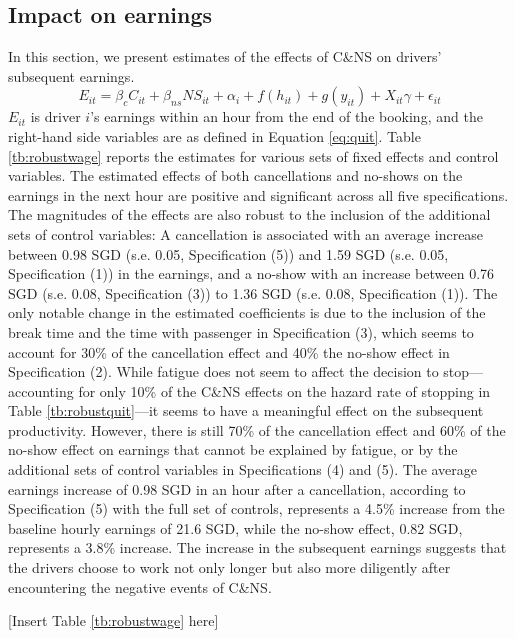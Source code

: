 \documentclass[reviewmode,AEJ]{AEA}
\begin{document}
\subsection{Impact on earnings}
In this section, we present estimates of the effects of C\&NS on drivers' subsequent earnings.
\begin{equation}
\label{eq:outcomes}
E_{it} = \beta_c C_{it} + \beta_{ns} {NS}_{it} + \alpha_i + f(h_{it}) + g(y_{it}) + X_{it}\gamma  + \epsilon_{it}
\end{equation}
$E_{it}$ is driver $i$'s earnings within an hour from the end of the booking, and the right-hand side variables are as defined in Equation \ref{eq:quit}. Table \ref{tb:robustwage} reports the estimates for various sets of fixed effects and control variables. The estimated effects of both cancellations and no-shows on the earnings in the next hour are positive and significant across all five specifications. The magnitudes of the effects are also robust to the inclusion of the additional sets of control variables: A cancellation is associated with an average increase between 0.98 SGD (s.e. 0.05, Specification (5)) and 1.59 SGD (s.e. 0.05, Specification (1)) in the earnings, and a no-show with an increase between 0.76 SGD (s.e. 0.08, Specification (3)) to 1.36 SGD (s.e. 0.08, Specification (1)). The only notable change in the estimated coefficients is due to the inclusion of the break time and the time with passenger in Specification (3), which seems to account for 30\% of the cancellation effect and 40\% the no-show effect in Specification (2). While fatigue does not seem to affect the decision to stop---accounting for only 10\% of the C\&NS effects on the hazard rate of stopping in Table \ref{tb:robustquit}---it seems to have a meaningful effect on the subsequent productivity. However, there is still 70\% of the cancellation effect and 60\% of the no-show effect on earnings that cannot be explained by fatigue, or by the additional sets of control variables in Specifications (4) and (5). The average earnings increase of 0.98 SGD in an hour after a cancellation, according to Specification (5) with the full set of controls, represents a 4.5\% increase from the baseline hourly earnings of 21.6 SGD, while the no-show effect, 0.82 SGD, represents a 3.8\% increase. The increase in the subsequent earnings suggests that the drivers choose to work not only  longer but also more diligently after encountering the negative events of C\&NS.


\begin{center}
	[Insert Table \ref{tb:robustwage} here]
\end{center}
\end{document}

